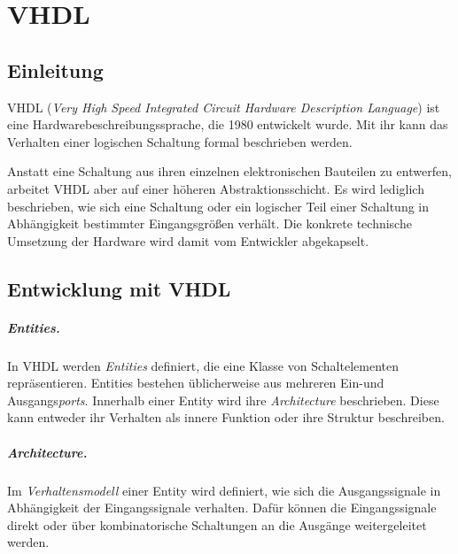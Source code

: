 \chapter{VHDL} %
\label{VHDL} %

\section{Einleitung}
VHDL (\textit{Very High Speed Integrated Circuit Hardware Description Language}) ist eine Hardwarebeschreibungssprache, die 1980 entwickelt wurde. Mit ihr kann das Verhalten einer logischen Schaltung formal beschrieben werden. \cite[S. 22f.]{kesel2013entwurf}

Anstatt eine Schaltung aus ihren einzelnen elektronischen Bauteilen zu entwerfen, arbeitet VHDL aber auf einer höheren Abstraktionsschicht. Es wird lediglich beschrieben, wie sich eine Schaltung oder ein logischer Teil einer Schaltung in Abhängigkeit bestimmter Eingangsgrößen verhält. Die konkrete technische Umsetzung der Hardware wird damit vom Entwickler abgekapselt.

\section{Entwicklung mit VHDL}
\paragraph{Entities.} In VHDL werden \textit{Entities} definiert, die eine Klasse von Schaltelementen repräsentieren. Entities bestehen üblicherweise aus mehreren Ein-und Ausgangs\textit{ports}. Innerhalb einer Entity wird ihre \emph{Architecture} beschrieben. Diese kann entweder ihr Verhalten als innere Funktion oder ihre Struktur beschreiben.

\paragraph{Architecture.} Im \emph{Verhaltensmodell} einer Entity wird definiert, wie sich die Ausgangssignale in Abhängigkeit der Eingangssignale verhalten. Dafür können die Eingangssignale direkt oder über kombinatorische Schaltungen an die Ausgänge weitergeleitet werden. 

